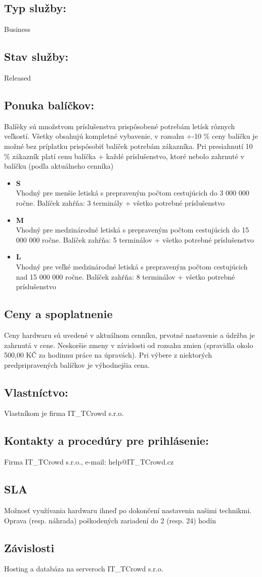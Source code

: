 \documentclass[a4paper, 11pt]{article}
\begin{document}
\subsection*{Typ služby:}
Business
\subsection*{Stav služby:}
Released
\subsection*{Ponuka balíčkov:}
Balíèky sú množstvom príslušenstva prispôsobené potrebám letísk rôznych veľkostí. Všetky obsahujú kompletné vybavenie, v rozsahu +-10 \% ceny balíčku je možné bez príplatku prispôsobiť balíček potrebám zákazníka. Pri presiahnutí 10 \% zákazník platí cenu balíčka + každé príslušenstvo, ktoré nebolo zahrnuté v balíčku (podľa aktuálneho cenníka)
\begin{itemize}
\item \textbf{S} \\
Vhodný pre menšie letiská s prepraveným počtom cestujúcich do 3 000 000 ročne. Balíček zahŕňa: 3 terminály + všetko potrebné príslušenstvo
\item \textbf{M} \\
Vhodný pre medzinárodné letiská s prepraveným počtom cestujúcich do 15 000 000 ročne. Balíček zahŕňa: 5 terminálov + všetko potrebné príslušenstvo
\item \textbf{L} \\
Vhodný pre veľké medzinárodné letiská s prepraveným počtom cestujúcich nad 15 000 000 ročne. Balíček zahŕňa: 8 terminálov + všetko potrebné príslušenstvo
\end{itemize}
\subsection*{Ceny a spoplatnenie}
Ceny hardwaru sú uvedené v aktuálnom cenníku, prvotné nastavenie a údržba je zahrnutá v cene. Neskoršie zmeny v závislosti od rozsahu zmien (spravidla okolo 500,00 KČ za hodinnu práce na úpravách). Pri výbere z niektorých predpripravených balíčkov je výhodnejšia cena.
\subsection*{Vlastníctvo:}
Vlastníkom je firma IT\_TCrowd s.r.o.
\subsection*{Kontakty a procedúry pre prihlásenie:}
Firma IT\_TCrowd s.r.o., e-mail: help@IT\_TCrowd.cz
\subsection*{SLA}
Možnosť využívania hardwaru ihneď po dokončení nastavenia našimi technikmi. Oprava (resp. náhrada) poškodených zariadení do 2 (resp. 24) hodín
\subsection*{Závislosti}
Hosting a databáza na serveroch IT\_TCrowd s.r.o.
\end{document}

